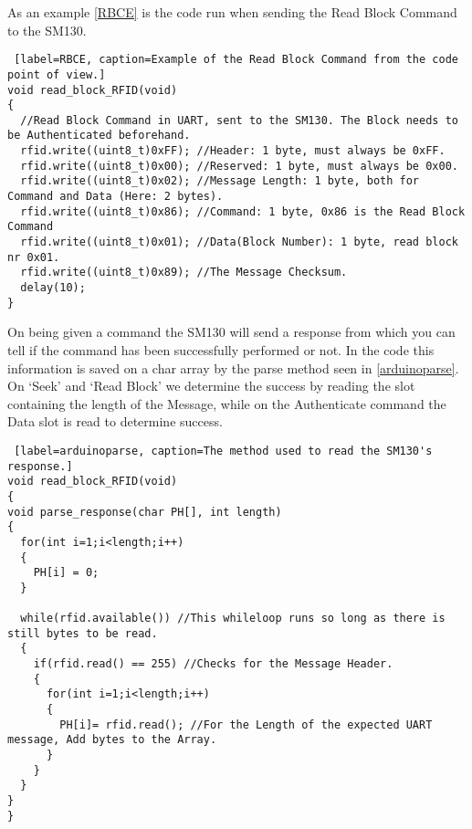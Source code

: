 As an example \autoref{RBCE} is the code run when sending the Read Block Command to the SM130.
\begin{lstlisting} [label=RBCE, caption=Example of the Read Block Command from the code point of view.]
void read_block_RFID(void)
{
  //Read Block Command in UART, sent to the SM130. The Block needs to be Authenticated beforehand.
  rfid.write((uint8_t)0xFF); //Header: 1 byte, must always be 0xFF.
  rfid.write((uint8_t)0x00); //Reserved: 1 byte, must always be 0x00.  
  rfid.write((uint8_t)0x02); //Message Length: 1 byte, both for Command and Data (Here: 2 bytes).
  rfid.write((uint8_t)0x86); //Command: 1 byte, 0x86 is the Read Block Command
  rfid.write((uint8_t)0x01); //Data(Block Number): 1 byte, read block nr 0x01. 
  rfid.write((uint8_t)0x89); //The Message Checksum.
  delay(10); 
}													
\end{lstlisting}


On being given a command the SM130 will send a response from which you can tell if the command has been successfully performed or not.
In the code this information is saved on a char array by the parse method seen in \autoref{arduinoparse}. 
On `Seek' and `Read Block' we determine the success by reading the slot containing the length of the Message, while on the Authenticate command the Data slot is read to determine success.

\begin{lstlisting} [label=arduinoparse, caption=The method used to read the SM130's response.]
void read_block_RFID(void)
{
void parse_response(char PH[], int length)
{
  for(int i=1;i<length;i++)
  {
    PH[i] = 0;
  }
  
  while(rfid.available()) //This whileloop runs so long as there is still bytes to be read. 
  {
    if(rfid.read() == 255) //Checks for the Message Header.
    {
      for(int i=1;i<length;i++)
      {
        PH[i]= rfid.read(); //For the Length of the expected UART message, Add bytes to the Array.
      }
    }
  }
}
}													
\end{lstlisting}

